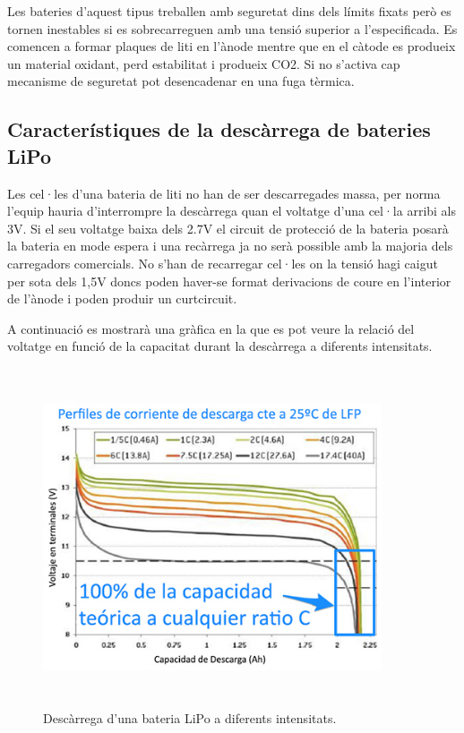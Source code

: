 Les bateries d'aquest tipus treballen amb seguretat dins dels límits fixats però es tornen inestables si es sobrecarreguen amb una tensió superior a l'especificada. Es comencen a formar plaques de liti en l'ànode mentre que en el càtode es produeix un material oxidant, perd estabilitat i produeix CO2. Si no s'activa cap mecanisme de seguretat pot desencadenar en una fuga tèrmica. 

\subsection{Característiques de la descàrrega de bateries LiPo}

Les cel·les d'una bateria de liti no han de ser descarregades massa, per norma l'equip hauria d'interrompre la descàrrega quan el voltatge d'una cel·la arribi als 3V. Si el seu voltatge baixa dels 2.7V el circuit de protecció de la bateria posarà la bateria en mode espera i una recàrrega ja no serà possible amb la majoria dels carregadors comercials. No s'han de recarregar cel·les on la tensió hagi caigut per sota dels 1,5V doncs poden haver-se format derivacions de coure en l'interior de l'ànode i poden produir un curtcircuit.

A continuació es mostrarà una gràfica en la que es pot veure la relació del voltatge en funció de la capacitat durant la descàrrega a diferents intensitats.

\begin{figure}[H]
	\centering
    \includegraphics[width=10cm, height=10cm] {Bateries/graficadescargabatlipo.jpg}
    \caption{Descàrrega d'una bateria LiPo a diferents intensitats.}
\end{figure}
